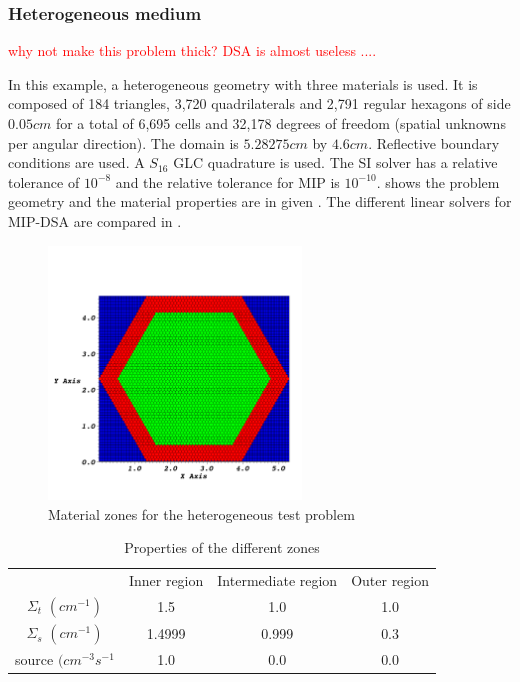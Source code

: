 \subsubsection{Heterogeneous medium}

\textcolor{red}{why not make this problem thick? DSA is almost useless ....\\}

In this example, a heterogeneous geometry with three materials is used. It is 
composed of 184 triangles, 3,720 quadrilaterals and 2,791 regular hexagons of 
side $0.05cm$ for a total of 6,695 cells and 32,178 degrees of freedom (spatial 
unknowns per angular direction). The domain is $5.28275cm$ by $4.6cm$. 
Reflective boundary conditions are used. A $S_{16}$ GLC 
quadrature is used. The SI solver has a relative tolerance of 
$10^{-8}$ and the relative tolerance for MIP is $10^{-10}$. 
shows the problem geometry and the material properties are in given
.
The different linear solvers for MIP-DSA are compared in .
%
\begin{figure}[!htbp]
  \centering
  \includegraphics[width=0.6\textwidth]{source_crop}
  \caption{Material zones for the heterogeneous test problem}
  \label{hex_zones}
\end{figure}
%
\begin{table}[!htbp]
  \begin{center}
    \caption{Properties of the different zones}
    \begin{tabular}{|c|c|c|c|}
      \hline
       & Inner region & Intermediate region & Outer region \\
      $\Sigma_t$ $(cm^{-1})$ & 1.5 & 1.0 & 1.0 \\
      $\Sigma_s$ $(cm^{-1})$ & 1.4999 & 0.999 & 0.3 \\
     source $(cm^{-3}s^{-1}$ & 1.0 & 0.0 & 0.0 \\
      \hline
    \end{tabular}
    \label{hex_prop}
  \end{center}
\end{table}
